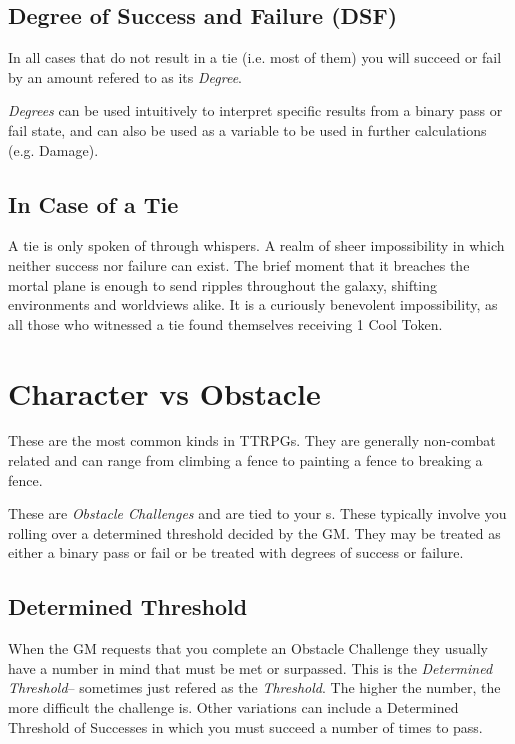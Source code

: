 
\subsection{Degree of Success and Failure (DSF)}\label{subsec:dsf}
In all cases that do not result in a tie (i.e. most of them) you will
succeed or fail by an amount refered to as its \emph{Degree}. 


\emph{Degrees} can be used intuitively to interpret specific results from
a binary pass or fail state, and can also be used as a variable to be used in further calculations
(e.g. Damage).

\subsection{In Case of a Tie}\label{subsec:tie}
A tie is only spoken of through whispers. A realm of sheer impossibility in which neither success nor failure can exist. The brief moment that it breaches the mortal plane is enough to send ripples throughout the galaxy, shifting environments and worldviews alike. It is a curiously benevolent impossibility, as all those who witnessed a tie found themselves receiving 1 Cool Token.

\section{Character vs Obstacle}\label{sec:vs_obstacle}
These are the most common kinds in TTRPGs. They are generally non-combat
related and can range from climbing a fence to painting a fence to
breaking a fence. 

These are \emph{Obstacle Challenges} and are tied to your \attribute s.
These typically involve you rolling over a determined threshold decided
by the GM. They may be treated as either a binary pass or fail or be
treated with degrees of success or failure.

\subsection{Determined Threshold}\label{subsec:determined_threshold}
When the GM requests that you complete an Obstacle Challenge they
usually have a number in mind that must be met or surpassed. This
is the \emph{Determined Threshold}-- sometimes just refered as the \emph{Threshold}. The higher the number, the more
difficult the challenge is. Other variations can include a Determined
Threshold of Successes in
which you must succeed a number of times to pass.

